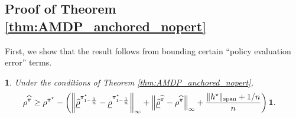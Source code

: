 \documentclass{article}
\theoremstyle{plain}
\theoremstyle{plain}
\newtheorem{lem}[thm]{\protect\lemmaname}
\theoremstyle{remark}
\theoremstyle{plain}
\theoremstyle{plain}
\providecommand{\lemmaname}{Lemma}
\newcommand{\pistar}{\pi^\star}
\newcommand{\one}{\mathbf{1}}
\newcommand{\pihat}{\widehat{\pi}}
\newcommand{\rhohat}{\widehat{\rho}}
\newcommand{\rhohatanc}{ \underline{\rhohat}}
\newcommand{\rhoanc}{\underline{\rho}}
\begin{document}
\subsection{Proof of Theorem \ref{thm:AMDP_anchored_nopert}}
\label{sec:AMDP_anch_nopert_pf}
First, we show that the result follows from bounding certain ``policy evaluation error'' terms. 
\begin{lem}
\label{lem:AMDP_anchored_nopert_decomposition}
    Under the conditions of Theorem \ref{thm:AMDP_anchored_nopert},
    \begin{align}
        \rho^{\pihat} & \geq \rho^{\pistar} - \left(\infnorm{\rhohatanc^{\pistar_{1 - \frac{1}{n}}} - \rhoanc^{\pistar_{1-\frac{1}{n}}}} + \infnorm{ \rhohatanc^{\pihat} - \rho^{\pihat}} + \frac{ \spannorm{h^\star} + 1/n }{n}\right)\one .
    \end{align}
\end{lem}
\end{document}

